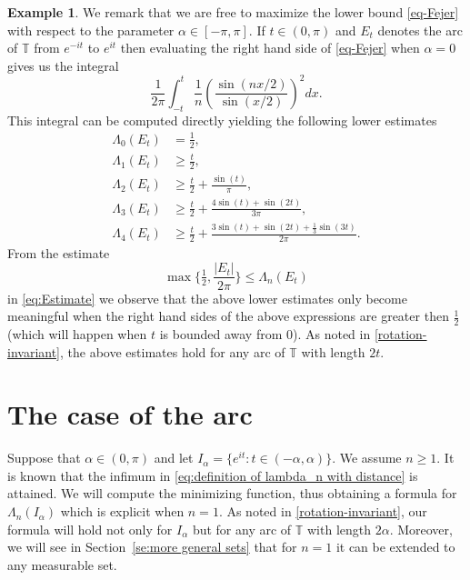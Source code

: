 \documentclass[11pt,reqno]{amsart}
\numberwithin{equation}{section}
\theoremstyle{plain}
\theoremstyle{definition}
\newtheorem{Example}[equation]{Example}
\begin{document}
\begin{Example}\label{ExampleRoss}
	We remark that we are free to maximize the lower bound 
	\eqref{eq-Fejer} with respect to the parameter $\alpha \in [-\pi, \pi]$.  If $t  \in (0, \pi)$ and $E_{t}$ denotes the arc of ${\mathbb{T}}$ from $e^{-i t}$ to $e^{i t}$ then evaluating the right hand side of \eqref{eq-Fejer} when $\alpha = 0$ gives us the integral 
	$$\frac{1}{2 \pi} \int_{-t}^{t} \frac{1}{n} \left(\frac{\sin(n x/2)}{\sin(x/2)}\right)^2 d x.$$ This integral can be computed directly yielding the following lower estimates
	\begin{align*}
		\Lambda_{0}(E_t) &= \tfrac{1}{2}, \\
		\Lambda_{1}(E_t) &\geq \frac{t}{2}, \\
		\Lambda_{2}(E_t) &\geq \frac{t}{2} + \frac{\sin (t)}{\pi},\\
		\Lambda_{3}(E_t) &\geq \frac{t}{2} + \frac{4 \sin (t)+\sin (2 t)}{3 \pi }, \\
		\Lambda_{4}(E_t) &\geq \frac{t}{2} + \frac{3 \sin (t)+\sin (2 t)+\frac{1}{3} \sin (3 t)}{2 \pi }.
	\end{align*}
From the estimate 
$$\max\big\{ \tfrac{1}{2}, \frac{|E_t|}{2 \pi} \big\} \leq \Lambda_n(E_t)$$ in \eqref{eq:Estimate} we observe that the above lower estimates only become meaningful when the right hand sides of the above expressions are greater then $\frac{1}{2}$ (which will happen when $t$ is bounded away from $0$). 
As noted in \eqref{rotation-invariant}, the above estimates hold for any arc of ${\mathbb{T}}$ with length $2 t$.  
\end{Example}

 \section{The case of the arc}\label{se:interval}

Suppose that $\alpha \in (0, \pi)$ and let $I_{\alpha}=\{e^{it}:t\in(-\alpha, \alpha)\}$. 
We assume $n \geq 1$. 
It is known \cite[p.~146]{Koosis} that the infimum in \eqref{eq:definition of lambda_n with distance} is attained. 
We will compute the minimizing function, thus obtaining a formula for $\Lambda_n(I_{\alpha})$ which is explicit when $n = 1$. As noted in \eqref{rotation-invariant}, our formula will hold not only for $I_{\alpha}$ but for any arc of ${\mathbb{T}}$ with length $2 \alpha$. Moreover, we will see in Section~\ref{se:more general sets} that for $n=1$ it can be extended to any measurable set.
\end{document}
